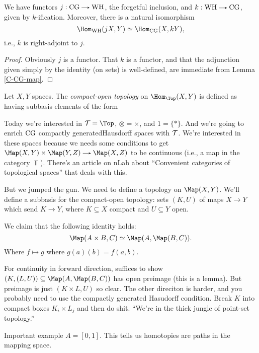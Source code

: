 \begin{proposition}
  We have functors $j : \CG \to \WH$, the forgetful inclusion, and $k
  : \WH \to \CG$, given by $k$-ification. Moreover, there is a natural
  isomorphism
  \[
  \Hom_\WH(jX, Y) \simeq \Hom_\CG(X, kY),
  \]
 i.e., $k$ is right-adjoint to $j$.
\end{proposition}

\begin{proof}
  Obviously $j$ is a functor. That $k$ is a functor, and that the
  adjunction given simply by the identity (on sets) is well-defined,
  are immediate from Lemma \ref{C-CG-map}.
\end{proof}

\begin{definition}
  Let $X,Y$ spaces. The \textit{compact-open topology} on
  $\Hom_\Top(X,Y)$ is defined as having subbasis elements of the form
\end{definition}

Today we're interested in $\T = \Top$, $\otimes = \times$, and $1 =
\{*\}$. And we're going to enrich $\mathrm{CG}$ compactly generatedHausdorff
spaces with $\mathcal{T}$. We're interested in these spaces because we needs
some conditions to get $\Map(X,Y) \times \Map(Y,Z) \to \Map(X,Z)$ to
be continuous (i.e., a map in the category $\Top$). There's an article
on nLab about ``Convenient categories of topological spaces'' that
deals with this.

But we jumped the gun. We need to define a topology on
$\Map(X,Y)$. We'll define a subbasis for the compact-open topology:
sets $(K,U)$ of maps $X \to Y$ which send $K \to Y$, where $K
\subseteq X$ compact and $U \subseteq Y$ open.

We claim that the following identity holds:
\[
\Map(A \times B, C) \simeq \Map(A, \Map(B,C)).
\]
Where $f \mapsto g$ where $g(a)(b) = f(a,b)$.

For continuity in forward direction, suffices to show $(K,(L,U))
\subseteq \Map(A, \Map(B,C))$ has open preimage (this is a lemma). But
preimage is just $(K \times L, U)$ so clear. The other direciton is
harder, and you probably need to use the compactly generated Hasudorff
condition. Break $K$ into compact boxes $K_i \times L_j$ and then do
shit. ``We're in the thick jungle of point-set topology.''

Important example $A = [0,1]$. This tells us homotopies are paths in
the mapping space.


